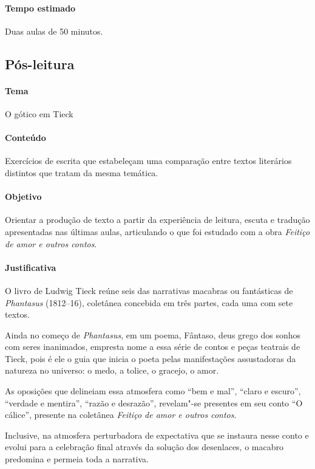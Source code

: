 \documentclass[12pt]{extarticle}
\begin{document}
\paragraph{Tempo estimado} Duas aulas de 50 minutos. 

\subsection{Pós-leitura}

\paragraph{Tema} O gótico em Tieck

\paragraph{Conteúdo} Exercícios de escrita que estabeleçam uma comparação entre 
textos literários distintos que tratam da mesma temática.

\paragraph{Objetivo} Orientar a produção de texto a partir da experiência
de leitura, escuta e tradução apresentadas nas últimas
aulas, articulando o que foi estudado com a obra \textit{Feitiço de amor e outros contos}.

\paragraph{Justificativa} O livro de Ludwig Tieck reúne seis das narrativas macabras
ou fantásticas de \textit{Phantasus} (1812–16), coletânea concebida em três
partes, cada uma com sete textos.

Ainda no começo de \textit{Phantasus}, em um poema, Fântaso,
deus grego dos sonhos com seres inanimados, empresta
nome a essa série de contos e peças teatrais de Tieck, pois
é ele o guia que inicia o poeta pelas manifestações assustadoras
da natureza no universo: o medo, a tolice, o gracejo,
o amor. 

As oposições que delineiam essa atmosfera como ``bem e mal'', 
``claro e escuro'', ``verdade e mentira'', ``razão e desrazão'', 
revelam"-se presentes em seu conto ``O cálice'', presente na 
coletânea \textit{Feitiço de amor e outros contos}.

Inclusive, na atmosfera perturbadora de expectativa
que se instaura nesse conto e evolui para a celebração
final através da solução dos desenlaces, o macabro predomina
e permeia toda a narrativa.
\end{document}
